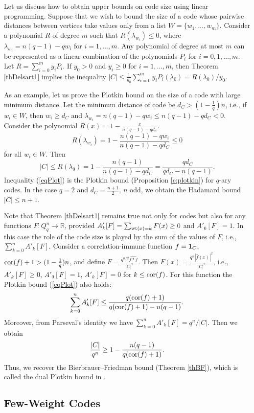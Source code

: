 \documentclass[11pt]{article}
\theoremstyle{definition}
\newcommand{\wt}{{\rm wt}}
\newcommand{\cor}{{\rm cor}}
\begin{document}
{{{Let us discuss how to obtain upper bounds on code size using linear programming. Suppose that we wish to bound the size of a code whose pairwise distances between vertices take values only from a list $W=\{w_1,\dots,w_m\}$. Consider a polynomial $R$ of degree $m$ such that $R(\lambda_{w_i})\leq 0$, where $\lambda_{w_i}=n(q-1)-qw_i$ for $i=1,\dots,m$. Any polynomial of degree at most $m$ can be represented as a linear combination of the polynomials $P_i$ for $i=0,1,\dots,m$. Let $R=\sum\limits_{i=0}^my_iP_i$. If $y_0>0$ and $y_i\geq 0$ for $i=1,\dots,m$, then Theorem \ref{thDelsart1} implies  the inequality $|C|\leq \frac{1}{y_0}\sum\limits_{i=0}^m y_iP_i(\lambda_0)=R(\lambda_0)/y_0$. 

As an example, let us prove the Plotkin bound on the size of a code with large minimum distance. Let the minimum  distance of code be $d_C> (1-\frac1q)n$, i.e., if $w_i\in W$, then  $w_i\geq d_C$ and $\lambda_{w_i}=n(q-1)-qw_i\leq  n(q-1)-qd_C<0$. Consider the polynomial $R(x)=1-\frac{x}{n(q-1)-qd_C}$. 
$$R(\lambda_{w_i})= 1-\frac{n(q-1)-qw_i}{n(q-1)-qd_C}\leq 0$$ for all $w_i\in W$. Then
\begin{equation}\label{eqPlot}
|C|\leq R(\lambda_0)=
1-\frac{n(q-1)}{n(q-1)-qd_C}=\frac{qd_C}{qd_C-n(q-1)}.
\end{equation}
Inequality (\ref{eqPlot}) is  the Plotkin bound (Proposition \ref{c:plotkin}) for $q$-ary codes. In the case $q=2$ and $d_C=\frac{n+1}{2}$, $n$ odd, we obtain the Hadamard bound $|C|\leq n+1$.

Note that Theorem \ref{thDelsart1} remains true not only for codes but also for any functions $F:Q^n_q\rightarrow \mathbb{R}$, provided $A'_k[F]=\sum_{\wt(x)=k}F(x)\geq 0$ and $A'_0[F]=1$. In this case the role of the code size is played by the sum of the values of $F$, i.e., $\sum\limits_{k=0}^nA'_k[F]$. Consider a correlation-immune function $f={\bf 1}_C$, $\cor(f)+1>(1-\frac1q)n$, and define $F=\frac{q^{n/2}\widehat{f*f}}{|C|^2}$. Then $F(x)=\frac{q^n|\widehat{f}(x)|^2}{|C|^2}$, i.e., $A'_k[F]\geq 0$, $A'_0[F]=1$, $A'_k[F]= 0$ for $k\leq \cor(f)$. For this function the Plotkin bound (\ref{eqPlot}) also holds:
$$\sum\limits_{k=0}^nA'_k[F]\leq
\frac{q(\cor(f)+1)}{q(\cor(f)+1)-n(q-1)}.$$
Moreover, from Parseval's identity we have $\sum\limits_{k=0}^nA'_k[F]=q^n/|C|$. Then we obtain
$$\frac{|C|}{q^n}\geq 1-\frac{n(q-1)}{q(\cor(f)+1)}.$$
Thus, we recover the Bierbrauer–Friedman bound (Theorem \ref{thBF}), which is called the dual Plotkin bound in \cite{Bierbook}.


\subsection{Few-Weight Codes }


}}}
\end{document}
